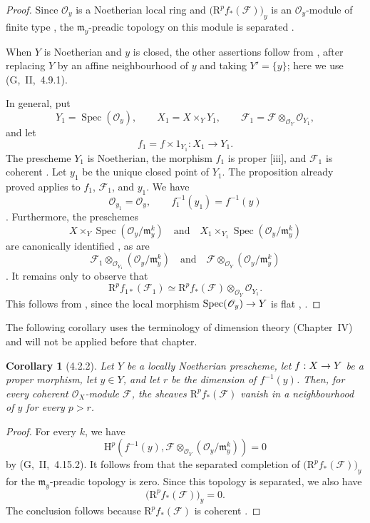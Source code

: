 \documentclass[oneside]{amsart}
\theoremstyle{ega-env-style}
\theoremstyle{ega-thm-env-style}
\newtheorem*{corollary}{Corollary}
\theoremstyle{ega-defn-env-style}
\def\mathcal{\mathscr}
\def\sh{\mathcal}                   %
\def\HH{\mathrm{H}}                 %
\def\RR{\mathrm{R}}                 %
\def\Spec{\operatorname{Spec}}
\renewcommand{\to}{\mathchoice{\longrightarrow}{\rightarrow}{\rightarrow}{\rightarrow}}
\let\EGAOriginalLabel\label
\renewcommand{\label}[1]{\phantomsection\EGAOriginalLabel{#1}}
\begin{document}
\begin{proof}
Since $\sh{O}_y$ is a Noetherian local ring and
$\bigl(\RR^p f_*(\sh{F})\bigr)_y$ is an $\sh{O}_y$-module of finite
type , the $\mathfrak{m}_y$-preadic topology on this
module is separated .

When $Y$ is Noetherian and $y$ is closed, the other assertions follow
from , after replacing $Y$ by an affine neighbourhood
of $y$ and taking $Y'=\{y\}$; here we use (G,~II,~4.9.1).

In general, put
\[
  Y_1=\Spec(\sh{O}_y),
  \qquad
  X_1=X\times_Y Y_1,
  \qquad
  \sh{F}_1
  =
  \sh{F}\otimes_{\sh{O}_Y}\sh{O}_{Y_1},
\]
and let
\[
  f_1=f\times 1_{Y_1}:X_1\longrightarrow Y_1.
\]
The prescheme $Y_1$ is Noetherian, the morphism $f_1$ is proper
[iii], and $\sh{F}_1$ is coherent
.
Let $y_1$ be the unique closed point of $Y_1$.
The proposition already proved applies to $f_1$, $\sh{F}_1$, and
$y_1$.
We have
\[
  \sh{O}_{y_1}=\sh{O}_y,
  \qquad
  f_1^{-1}(y_1)=f^{-1}(y)
\]
.
Furthermore, the preschemes
\[
  X\times_Y\Spec(\sh{O}_y/\mathfrak{m}_y^k)
  \quad\text{and}\quad
  X_1\times_{Y_1}\Spec(\sh{O}_y/\mathfrak{m}_y^k)
\]
are canonically identified , as are
\[
  \sh{F}_1
  \otimes_{\sh{O}_{Y_1}}
  (\sh{O}_y/\mathfrak{m}_y^k)
  \quad\text{and}\quad
  \sh{F}
  \otimes_{\sh{O}_Y}
  (\sh{O}_y/\mathfrak{m}_y^k)
\]
.
It remains only to observe that
\[
  \RR^p f_{1*}(\sh{F}_1)
  \simeq
  \RR^p f_*(\sh{F})
  \otimes_{\sh{O}_Y}
  \sh{O}_{Y_1}.
\]
This follows from , since the local morphism
$\Spec(\sh{O}_y)\to Y$ is flat
, .
\end{proof}

The following corollary uses the terminology of dimension theory
(Chapter~IV) and will not be applied before that chapter.

\begin{corollary}[4.2.2]
\label{III.4.2.2}
Let $Y$ be a locally Noetherian prescheme, let $f:X\to Y$ be a
proper morphism, let $y\in Y$, and let $r$ be the dimension of
$f^{-1}(y)$.
Then, for every coherent $\sh{O}_X$-module $\sh{F}$, the sheaves
$\RR^p f_*(\sh{F})$ vanish in a neighbourhood of $y$ for every
$p>r$.
\end{corollary}

\begin{proof}
For every $k$, we have
\[
  \HH^p\left(
    f^{-1}(y),
    \sh{F}\otimes_{\sh{O}_Y}
    (\sh{O}_y/\mathfrak{m}_y^k)
  \right)
  =
  0
\]
by (G,~II,~4.15.2).
It follows from  that the separated completion of
$\bigl(\RR^p f_*(\sh{F})\bigr)_y$ for the
$\mathfrak{m}_y$-preadic topology is zero.
Since this topology is separated, we also have
\[
  \bigl(\RR^p f_*(\sh{F})\bigr)_y=0.
\]
The conclusion follows because $\RR^p f_*(\sh{F})$ is coherent
.
\end{proof}
\end{document}
